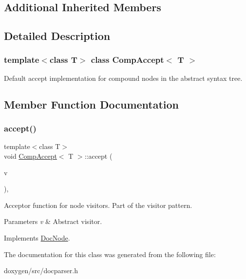 \subsection*{Additional Inherited Members}


\subsection{Detailed Description}
\subsubsection*{template$<$class T$>$\newline
class Comp\+Accept$<$ T $>$}

Default accept implementation for compound nodes in the abstract syntax tree. 

\subsection{Member Function Documentation}
\mbox{\label{class_comp_accept_a3f3a6b3476c5f0166163c4c5267c4ab0}} 
\subsubsection{\texorpdfstring{accept()}{accept()}}
{\footnotesize\ttfamily template$<$class T$>$ \\
void \mbox{\hyperlink{class_comp_accept}{Comp\+Accept}}$<$ T $>$\+::accept (\begin{DoxyParamCaption}\item[{\mbox{\hyperlink{class_doc_visitor}{Doc\+Visitor}} $\ast$}]{v }\end{DoxyParamCaption})\hspace{0.3cm}{\ttfamily [inline]}, {\ttfamily [virtual]}}

Acceptor function for node visitors. Part of the visitor pattern. 
\begin{DoxyParams}{Parameters}
{\em v} & Abstract visitor. \\
\hline
\end{DoxyParams}


Implements \mbox{\hyperlink{class_doc_node_a5303a550cbe6395663bf9b9dad28cbf1}{Doc\+Node}}.



The documentation for this class was generated from the following file\+:\begin{DoxyCompactItemize}
\item 
doxygen/src/docparser.\+h\end{DoxyCompactItemize}
